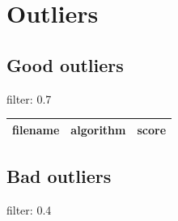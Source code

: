 \documentclass[a4paper,10pt]{article}
\begin{document}
\section*{Outliers}
\subsection*{Good outliers}
filter: 0.7

				\begin{table}[htbp]
				\centering
				\begin{tabular}{|c|c|c|}
				\hline
				filename&algorithm&score\\
				\hline
				
				\hline
				\end{tabular}
				\end{table}
				 
\subsection*{Bad outliers}
filter: 0.4
\end{document}
